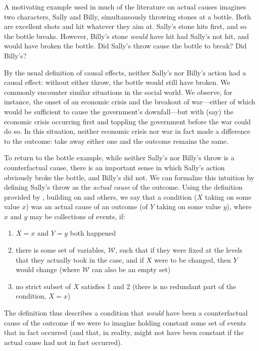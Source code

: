 \documentclass[
  12pt,
]{book}
\providecommand{\tightlist}{%
  \setlength{\itemsep}{0pt}\setlength{\parskip}{0pt}}
\begin{document}
A motivating example used in much of the literature on actual causes \citep[e.g.][]{hall2004two} imagines two characters, Sally and Billy, simultaneously throwing stones at a bottle. Both are excellent shots and hit whatever they aim at. Sally's stone hits first, and so the bottle breaks. However, Billy's stone \emph{would} have hit had Sally's not hit, and would have broken the bottle. Did Sally's throw cause the bottle to break? Did Billy's?

By the usual definition of causal effects, neither Sally's nor Billy's action had a causal effect: without either throw, the bottle would still have broken. We commonly encounter similar situations in the social world. We observe, for instance, the onset of an economic crisis and the breakout of war---either of which would be sufficient to cause the government's downfall---but with (say) the economic crisis occurring first and toppling the government before the war could do so. In this situation, neither economic crisis nor war in fact made a difference to the outcome: take away either one and the outcome remains the same.

To return to the bottle example, while neither Sally's nor Billy's throw is a counterfactual cause, there is an important sense in which Sally's action obviously broke the bottle, and Billy's did not. We can formalize this intuition by defining Sally's throw as the \emph{actual cause} of the outcome. Using the definition provided by \citep{halpern2015modification}, building on \citep{halpern2005causesa} and others, we say that a condition (\(X\) taking on some value \(x\)) was an actual cause of an outcome (of \(Y\) taking on some value \(y\)), where \(x\) and \(y\) may be collections of events, if:

\begin{enumerate}
\def\labelenumi{\arabic{enumi}.}
\tightlist
\item
  \(X=x\) and \(Y=y\) both happened
\item
  there is some set of variables, \(\mathcal W\), such that if they were fixed at the levels that they actually took in the case, and if \(X\) were to be changed, then \(Y\) would change (where \(\mathcal W\) can also be an empty set)
\item
  no strict subset of \(X\) satisfies 1 and 2 (there is no redundant part of the condition, \(X=x\))
\end{enumerate}

The definition thus describes a condition that \emph{would} have been a counterfactual cause of the outcome if we were to imagine holding constant some set of events that in fact occurred (and that, in reality, might not have been constant if the actual cause had not in fact occurred).
\end{document}
